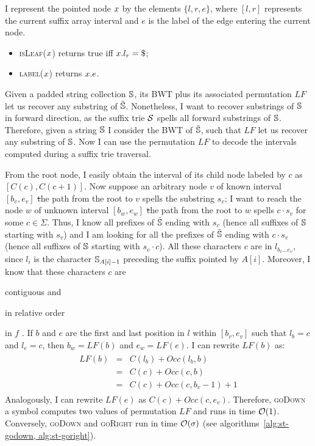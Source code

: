 I represent the pointed node $x$ by the elements $\{ l, r, e \}$, where $[l,r]$ represents the current suffix array interval and $e$ is the label of the edge entering the current node.
\begin{itemize}
\item \textsc{isLeaf}($x$) returns true iff $\Tn.l_r = \$$;
\item \textsc{label}($x$) returns $x.e$.
\end{itemize}

Given a padded string collection $\mathbb {S}$, its BWT plus its associated permutation $LF$ let us recover any substring of $\bar{\mathbb {S}}$.
Nonetheless, I want to recover substrings of $\mathbb {S}$ in forward direction, as the suffix trie $\mathcal {S}$ spells all forward substrings of $\mathbb {S}$.
Therefore, given a string $\mathbb {S}$ I consider the BWT of $\bar{\mathbb {S}}$, such that $LF$ let us recover any substring of $\mathbb {S}$.
Now I can use the permutation $LF$ to decode the intervals computed during a suffix trie traversal.

From the root node, I easily obtain the interval of its child node labeled by $c$ as $[C(c),C(c+1)]$.
Now suppose an arbitrary node $v$ of known interval $[b_v, e_v]$ \st the path from the root to $v$ spells the substring $s_v$;
I want to reach the node $w$ of unknown interval $[b_w, e_w]$ \st the path from the root to $w$ spells $c \cdot s_v$ for some $c \in \Sigma$.
Thus, I know all prefixes of $\bar{\mathbb {S}}$ ending with $s_v$ (hence all suffixes of $\mathbb {S}$ starting with $s_v$) and I am looking for all the prefixes of $\bar{\mathbb {S}}$ ending with $c \cdot s_v$ (hence all suffixes of $\mathbb {S}$ starting with $s_v \cdot c$).
All these characters $c$ are in $l_{b_v \dots e_v}$, since $l_i$ is the character $\mathbb {S}_{A[i] - 1}$ preceding the suffix pointed by $A[i]$.
Moreover, I know that these characters $c$ are
\begin{inparaenum}[(i)]
\item contiguous and
\item in relative order
\end{inparaenum}
in $f$ \citep{Ferragina2000}.
If $b$ and $e$ are the first and last position in $l$ within $[b_v, e_v]$ such that $l_b = c$ and $l_e = c$, then $b_w = LF(b)$ and $e_w = LF(e)$.
I can rewrite $LF(b)$ as:
\begin{eqnarray}
\begin{array}{lcl}
LF(b) &=& C(l_b) + Occ(l_b, b)\\
 	  &=& C(c) + Occ(c, b)\\
	  &=& C(c) + Occ(c, b_v - 1) + 1
\end{array}
\end{eqnarray}
Analogously, I can rewrite $LF(e)$ as $C(c) + Occ(c, e_v)$.
Therefore, \textsc{goDown} a symbol computes two values of permutation $LF$ and runs in time $\mathcal{O}(1)$.
Conversely, \textsc{goDown} and \textsc{goRight} run in time $\mathcal{O}(\sigma)$ (see algorithms~\ref{alg:st-godown, alg:st-goright}).


